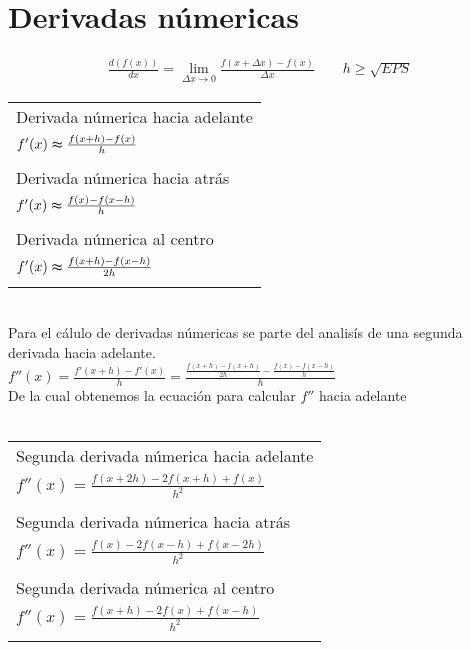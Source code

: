 \chapter{Derivadas n\'umericas}
\begin{center}
\begin{eqnarray}
\nonumber
\frac{d(f(x))}{dx}=\lim\limits_{\Delta x\to0}\frac{f(x+\Delta x)-f(x)}{\Delta x} \qquad\nonumber h\geq\sqrt{EPS}
\end{eqnarray}
\end{center}
\begin{tabular}{ l }
 Derivada n\'umerica hacia adelante \\
$f'(x)\thickapprox \frac{f(x+h)-f(x)}{h}$ \\
\\
 Derivada n\'umerica hacia atr\'as \\
$f'(x)\thickapprox \frac{f(x)-f(x-h)}{h}$ \\
\\
 Derivada n\'umerica al centro \\
$f'(x)\thickapprox \frac{f(x+h)-f(x-h)}{2h}$ \\
\\
\end{tabular}
\\
Para el c\'alulo de derivadas n\'umericas se parte del analis\'is de una segunda derivada hacia adelante.\\
$f''(x)=\frac{f'(x+h)-f'(x)}{h}=\frac{\frac{f(x+h)-f(x+h)}{2h}-\frac{f(x)-f(x-h)}{h}}{h}$
\\De la cual obtenemos la ecuaci\'on para calcular $f''$ hacia adelante\\ \\
\begin{tabular}{  l  }
Segunda derivada n\'umerica hacia adelante \\
$f''(x)=\frac{f(x+2h)-2f(x+h)+f(x)}{h^2}$ \\
\\
Segunda derivada n\'umerica hacia atr\'as \\
$f''(x)=\frac{f(x)-2f(x-h)+f(x-2h)}{h^2}$ \\
\\
Segunda derivada n\'umerica al centro \\
$f''(x)=\frac{f(x+h)-2f(x)+f(x-h)}{h^2}$ \\
\\
\end{tabular}
\\
